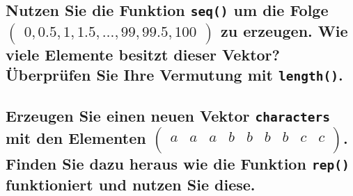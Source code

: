 \documentclass[12pt,a4paper]{article}
\begin{document}
\hypertarget{nutzen-sie-die-funktion-um-die-folge-beginpmatrix-0-0.5-1-1.5-ldots-99-99.5-100-endpmatrix-zu-erzeugen.-wie-viele-elemente-besitzt-dieser-vektor-uxfcberpruxfcfen-sie-ihre-vermutung-mit-.}{%
\subsection{\texorpdfstring{Nutzen Sie die Funktion \texttt{seq()} um
die Folge
\linebreak \(\begin{pmatrix} 0, 0.5, 1, 1.5, \ldots, 99, 99.5, 100 \end{pmatrix}\)
zu erzeugen. Wie viele Elemente besitzt dieser Vektor? Überprüfen Sie
Ihre Vermutung mit
\texttt{length()}.}{Nutzen Sie die Funktion  um die Folge \textbackslash begin\{pmatrix\} 0, 0.5, 1, 1.5, \textbackslash ldots, 99, 99.5, 100 \textbackslash end\{pmatrix\} zu erzeugen. Wie viele Elemente besitzt dieser Vektor? Überprüfen Sie Ihre Vermutung mit .}}\label{nutzen-sie-die-funktion-um-die-folge-beginpmatrix-0-0.5-1-1.5-ldots-99-99.5-100-endpmatrix-zu-erzeugen.-wie-viele-elemente-besitzt-dieser-vektor-uxfcberpruxfcfen-sie-ihre-vermutung-mit-.}}

\hypertarget{erzeugen-sie-einen-neuen-vektor-mit-den-elementen-beginpmatrix-a-a-a-b-b-b-b-c-c-endpmatrix.-finden-sie-dazu-heraus-wie-die-funktion-funktioniert-und-nutzen-sie-diese.}{%
\subsection{\texorpdfstring{Erzeugen Sie einen neuen Vektor
\texttt{characters} mit den Elementen
\(\begin{pmatrix} a & a & a & b & b & b & b & c & c \\ \end{pmatrix}\).
Finden Sie dazu heraus wie die Funktion \texttt{rep()} funktioniert und
nutzen Sie
diese.}{Erzeugen Sie einen neuen Vektor  mit den Elementen \textbackslash begin\{pmatrix\} a \& a \& a \& b \& b \& b \& b \& c \& c \textbackslash\textbackslash{} \textbackslash end\{pmatrix\}. Finden Sie dazu heraus wie die Funktion  funktioniert und nutzen Sie diese.}}\label{erzeugen-sie-einen-neuen-vektor-mit-den-elementen-beginpmatrix-a-a-a-b-b-b-b-c-c-endpmatrix.-finden-sie-dazu-heraus-wie-die-funktion-funktioniert-und-nutzen-sie-diese.}}
\end{document}
